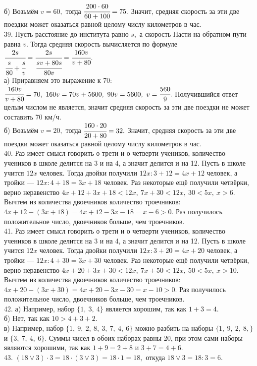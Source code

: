 б) Возьмём $v=60,$ тогда $\cfrac{200\cdot60}{60+100}=75.$ Значит, средняя скорость за эти две поездки может оказаться равной целому числу километров в час.\\
39. Пусть расстояние до института равно $s,$ а скорость Насти на обратном пути равна $v.$ Тогда средняя скорость вычисляется по формуле $\cfrac{2s}{\cfrac{s}{80}+\cfrac{s}{v}}=\cfrac{2s}{\cfrac{sv+80s}{80v}}=\cfrac{160v}{v+80}.$\\
а) Приравняем это выражение к 70: $\cfrac{160v}{v+80}=70,\ 160v=70v+5600,\ 90v=5600,\ v=\cfrac{560}{9}.$ Получившийся ответ целым числом не является, значит средняя скорость за эти две поездки не может составить 70 км/ч.\\
б) Возьмём $v=20,$ тогда $\cfrac{160\cdot20}{20+80}=32.$ Значит, средняя скорость за эти две поездки может оказаться равной целому числу километров в час.\\
40. Раз имеет смысл говорить о трети и о четверти учеников, количество учеников в школе делится на 3 и на 4, а значит делится и на 12. Пусть в школе учится $12x$ человек. Тогда двойки получили $12x:3+12=4x+12$ человек, а тройки --- $12x:4+18=3x+18$ человек. Раз некоторые ещё получили четвёрки, верно неравенство $4x+12+3x+18<12x,\ 7x+30<12x,\ 30<5x,\ x>6.$ Вычтем из количества двоечников количество троечников: $4x+12-(3x+18)=4x+12-3x-18=x-6>0.$ Раз получилось положительное число, двоечников больше, чем троечников.\\
41. Раз имеет смысл говорить о трети и о четверти учеников, количество учеников в школе делится на 3 и на 4, а значит делится и на 12. Пусть в школе учится $12x$ человек. Тогда двойки получили $12x:3+20=4x+20$ человек, а тройки --- $12x:4+30=3x+30$ человек. Раз некоторые ещё получили четвёрки, верно неравенство $4x+20+3x+30<12x,\ 7x+50<12x,\ 50<5x,\ x>10.$ Вычтем из количества двоечников количество троечников: $4x+20-(3x+30)=4x+20-3x-30=x-10>0.$ Раз получилось положительное число, двоечников больше, чем троечников.\\
42. а) Например, набор $\{1,\ 3,\ 4\}$ является хорошим, так как $1+3=4.$\\
б) Нет, так как $10>4+3+2.$\\
в) Например, набор $\{1,\ 9,\ 2,\ 8,\ 3,\ 7,\ 4,\ 6\}$ можно разбить на наборы $\{1,\ 9,\ 2,\ 8,\}$ и $\{3,\ 7,\ 4,\ 6\}.$ Суммы чисел в обоих наборах равны 20, при этом сами наборы являются хорошими, так как $1+9=2+8$ и $3+7=4+6.$\\
43. $(18\vee 3)\cdot3=18\cdot(3\vee3)=18\cdot1=18,$ откуда $18\vee3=18:3=6.$\\
